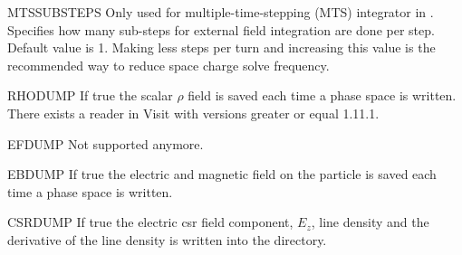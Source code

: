 \begin{kdescription}
  \item[MTSSUBSTEPS]
  Only used for multiple-time-stepping (MTS) integrator in \opalcycl. Specifies how many sub-steps for external field integration are done per step. Default value is 1.
  Making less steps per turn and increasing this value is the recommended way to reduce space charge solve frequency.

  \item[RHODUMP]
  If true the scalar $\rho$ field is saved each time a phase space is written. There exists a reader in Visit with versions
  greater or equal 1.11.1.

  \item[EFDUMP]
  Not supported anymore.

  \item[EBDUMP]
  If true the electric and magnetic field on the particle is saved each time a phase space is written.

  \item[CSRDUMP]
  If true the electric csr field component, $E_z$, line density and the derivative of the line density is written into the  directory.




\end{kdescription}
